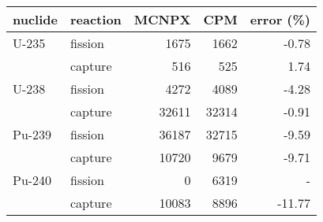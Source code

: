 \documentclass{article}
\begin{document}
\footnotesize\begin{tabular}{llrrr}\toprule
nuclide & reaction & MCNPX & CPM & error (\%)\\ 
\midrule
U-235 & fission & 1675 & 1662 & -0.78\\ 
\cmidrule{2-5}
 & capture & 516 & 525 & 1.74\\ 
\cmidrule{1-5}
U-238 & fission & 4272 & 4089 & -4.28\\ 
\cmidrule{2-5}
 & capture & 32611 & 32314 & -0.91\\ 
\cmidrule{1-5}
Pu-239 & fission & 36187 & 32715 & -9.59\\ 
\cmidrule{2-5}
 & capture & 10720 & 9679 & -9.71\\ 
\cmidrule{1-5}
Pu-240 & fission & 0 & 6319 & -\\ 
\cmidrule{2-5}
 & capture & 10083 & 8896 & -11.77\\ 
\bottomrule\end{tabular}
\end{document}
